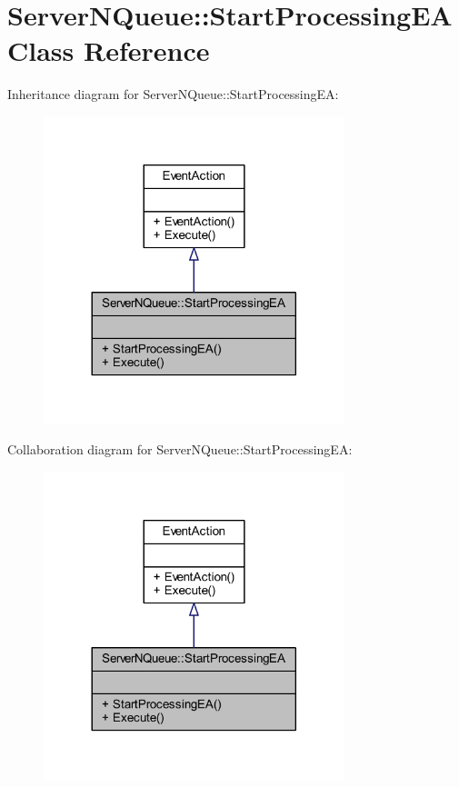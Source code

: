 \hypertarget{class_server_n_queue_1_1_start_processing_e_a}{}\section{Server\+N\+Queue\+:\+:Start\+Processing\+EA Class Reference}
\label{class_server_n_queue_1_1_start_processing_e_a}


Inheritance diagram for Server\+N\+Queue\+:\+:Start\+Processing\+EA\+:
\nopagebreak
\begin{figure}[H]
\begin{center}
\leavevmode
\includegraphics[width=248pt]{class_server_n_queue_1_1_start_processing_e_a__inherit__graph}
\end{center}
\end{figure}


Collaboration diagram for Server\+N\+Queue\+:\+:Start\+Processing\+EA\+:
\nopagebreak
\begin{figure}[H]
\begin{center}
\leavevmode
\includegraphics[width=248pt]{class_server_n_queue_1_1_start_processing_e_a__coll__graph}
\end{center}
\end{figure}
